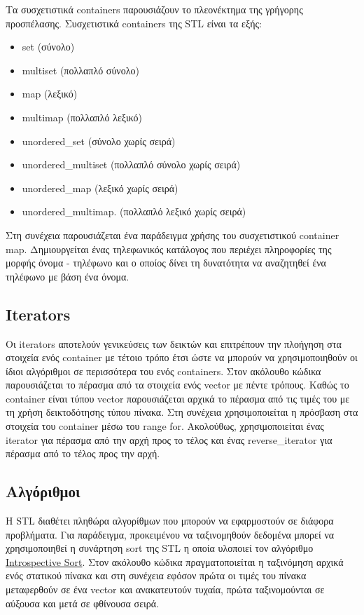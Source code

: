 Τα συσχετιστικά containers παρουσιάζουν το πλεονέκτημα της γρήγορης προσπέλασης. Συσχετιστικά containers της STL είναι τα εξής: 
\begin{itemize}[noitemsep]
\item set (σύνολο)
\item multiset (πολλαπλό σύνολο)
\item map (λεξικό)
\item multimap (πολλαπλό λεξικό)
\item unordered\_set (σύνολο χωρίς σειρά)
\item unordered\_multiset (πολλαπλό σύνολο χωρίς σειρά)
\item unordered\_map (λεξικό χωρίς σειρά)
\item unordered\_multimap. (πολλαπλό λεξικό χωρίς σειρά)
\end{itemize}

Στη συνέχεια παρουσιάζεται ένα παράδειγμα χρήσης του συσχετιστικού container map. Δημιουργείται ένας τηλεφωνικός κατάλογος που περιέχει πληροφορίες της μορφής όνομα - τηλέφωνο και ο οποίος δίνει τη δυνατότητα να αναζητηθεί ένα τηλέφωνο με βάση ένα όνομα.






\subsection{Iterators}
Οι iterators αποτελούν γενικεύσεις των δεικτών και επιτρέπουν την πλοήγηση στα στοιχεία ενός container με τέτοιο τρόπο έτσι ώστε να μπορούν να χρησιμοποιηθούν οι ίδιοι αλγόριθμοι σε περισσότερα του ενός containers. Στον ακόλουθο κώδικα παρουσιάζεται το πέρασμα από τα στοιχεία ενός vector με πέντε τρόπους. Καθώς το container είναι τύπου vector παρουσιάζεται αρχικά το πέρασμα από τις τιμές του με τη χρήση δεικτοδότησης τύπου πίνακα. Στη συνέχεια χρησιμοποιείται η πρόσβαση στα στοιχεία του container μέσω του range for. Ακολούθως, χρησιμοποιείται ένας iterator για πέρασμα από την αρχή προς το τέλος και ένας reverse\_iterator για πέρασμα από το τέλος προς την αρχή. 





\subsection{Αλγόριθμοι}
H STL διαθέτει πληθώρα αλγορίθμων που μπορούν να εφαρμοστούν σε διάφορα προβλήματα. Για παράδειγμα, προκειμένου να ταξινομηθούν δεδομένα μπορεί να χρησιμοποιηθεί η συνάρτηση sort της STL η οποία υλοποιεί τον αλγόριθμο \href{https://xlinux.nist.gov/dads/HTML/introspectiveSort.html}{Introspective Sort}. Στον ακόλουθο κώδικα πραγματοποιείται η ταξινόμηση αρχικά ενός στατικού πίνακα και στη συνέχεια εφόσον πρώτα οι τιμές του πίνακα μεταφερθούν σε ένα vector και ανακατευτούν τυχαία, πρώτα ταξινομούνται σε αύξουσα και μετά σε φθίνουσα σειρά.

